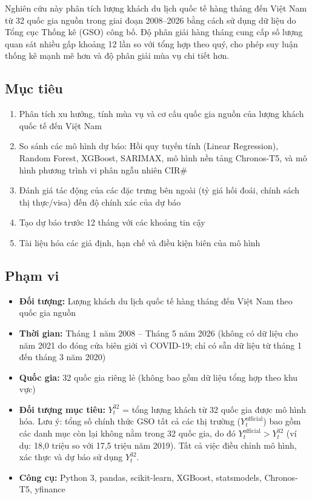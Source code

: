\documentclass[
]{article}
\providecommand{\tightlist}{%
  \setlength{\itemsep}{0pt}\setlength{\parskip}{0pt}}
\begin{document}
Nghiên cứu này phân tích lượng khách du lịch quốc tế hàng tháng đến Việt
Nam từ 32 quốc gia nguồn trong giai đoạn 2008--2026 bằng cách sử dụng dữ
liệu do Tổng cục Thống kê (GSO) công bố. Độ phân giải hàng tháng cung
cấp số lượng quan sát nhiều gấp khoảng 12 lần so với tổng hợp theo quý,
cho phép suy luận thống kê mạnh mẽ hơn và độ phân giải mùa vụ chi tiết
hơn.

\subsection{Mục tiêu}\label{mux1ee5c-tiuxeau}

\begin{enumerate}
\def\labelenumi{\arabic{enumi}.}
\tightlist
\item
  Phân tích xu hướng, tính mùa vụ và cơ cấu quốc gia nguồn của lượng
  khách quốc tế đến Việt Nam
\item
  So sánh các mô hình dự báo: Hồi quy tuyến tính (Linear Regression),
  Random Forest, XGBoost, SARIMAX, mô hình nền tảng Chronos-T5, và mô
  hình phương trình vi phân ngẫu nhiên CIR\#
\item
  Đánh giá tác động của các đặc trưng bên ngoài (tỷ giá hối đoái, chính
  sách thị thực/visa) đến độ chính xác của dự báo
\item
  Tạo dự báo trước 12 tháng với các khoảng tin cậy
\item
  Tài liệu hóa các giả định, hạn chế và điều kiện biên của mô hình
\end{enumerate}

\subsection{Phạm vi}\label{phux1ea1m-vi}

\begin{itemize}
\tightlist
\item
  \textbf{Đối tượng:} Lượng khách du lịch quốc tế hàng tháng đến Việt
  Nam theo quốc gia nguồn
\item
  \textbf{Thời gian:} Tháng 1 năm 2008 -- Tháng 5 năm 2026 (không có dữ
  liệu cho năm 2021 do đóng cửa biên giới vì COVID-19; chỉ có sẵn dữ
  liệu từ tháng 1 đến tháng 3 năm 2020)
\item
  \textbf{Quốc gia:} 32 quốc gia riêng lẻ (không bao gồm dữ liệu tổng
  hợp theo khu vực)
\item
  \textbf{Đối tượng mục tiêu:} \(Y^{32}_t\) = tổng lượng khách từ 32
  quốc gia được mô hình hóa. Lưu ý: tổng số chính thức GSO tất cả các
  thị trường (\(Y^{\mathrm{official}}_t\)) bao gồm các danh mục còn lại
  không nằm trong 32 quốc gia, do đó
  \(Y^{\mathrm{official}}_t > Y^{32}_t\) (ví dụ: 18,0 triệu so với 17,5
  triệu năm 2019). Tất cả việc điều chỉnh mô hình, xác thực và dự báo sử
  dụng \(Y^{32}_t\).
\item
  \textbf{Công cụ:} Python 3, pandas, scikit-learn, XGBoost,
  statsmodels, Chronos-T5, yfinance
\end{itemize}
\end{document}
